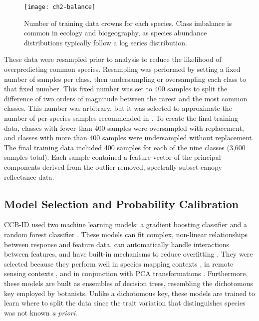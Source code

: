 \begin{figure}[!ht]
\texttt{[image: ch2-balance]}
\centering
\caption[Class imbalance in training data based on the number of tree crowns for each species.]{Number of training data crowns for each species. Class imbalance is common in ecology and biogeography, as species abundance distributions typically follow a log series distribution.}
\label{fig:balance}
\end{figure}

These data were resampled prior to analysis to reduce the likelihood of overpredicting common species. Resampling was performed by setting a fixed number of samples per class, then undersampling or oversampling each class to that fixed number. This fixed number was set to 400 samples to split the difference of two orders of magnitude between the rarest and the most common classes. This number was arbitrary, but it was selected to approximate the number of per-species samples recommended in \cite{Baldeck2014-du}. To create the final training data, classes with fewer than 400 samples were oversampled with replacement, and classes with more than 400 samples were undersampled without replacement. The final training data included 400 samples for each of the nine classes (3,600 samples total). Each sample contained a feature vector of the principal components derived from the outlier removed, spectrally subset canopy reflectance data.

\subsection{Model Selection and Probability Calibration}

CCB-ID used two machine learning models: a gradient boosting classifier and a random forest classifier \cite{Friedman2001-nq, Breiman2001-ka}. These models can fit complex, non-linear relationships between response and feature data, can automatically handle interactions between features, and have built-in mechanisms to reduce overfitting \cite{Mascaro2014-et}. They were selected because they perform well in species mapping contexts \cite{Elith2008-ye}, in remote sensing contexts \cite{Pal2005-qh}, and in conjunction with PCA transformations \cite{Rodriguez2006-ha}. Furthermore, these models are built as ensembles of decision trees, resembling the dichotomous key employed by botanists. Unlike a dichotomous key, these models are trained to learn where to split the data since the trait variation that distinguishes species was not known \textit{a priori}.

